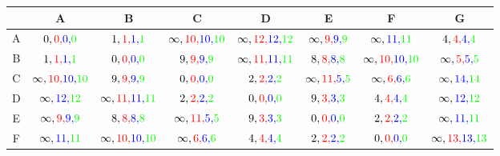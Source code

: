 \documentclass[a4paper,10pt]{article}
\begin{document}
\begin{table}[H]
\centering
\begin{tabular}{|c|c|c|c|c|c|c|c|} \hline
 & A & B & C & D & E & F & G  \\\hline
A & $ 0,{\color{red}0,}{\color{blue}0,}{\color{green}0} $ & $1,{\color{red}1,}{\color{blue}1,}{\color{green}1} $ & $ \infty,{\color{red}10,}{\color{blue}10,}{\color{green}10} $ & $ \infty,{\color{red}12,}{\color{blue}12,}{\color{green}12} $ & $ \infty,{\color{red}9,}{\color{blue}9,}{\color{green}9} $ & $ \infty,{\color{blue}11,}{\color{green}11} $ & $ 4,{\color{red}4,}{\color{blue}4,}{\color{green}4} $ \\\hline
B & $1,{\color{red}1,}{\color{blue}1,}{\color{green}1} $ & $0,{\color{red}0,}{\color{blue}0,}{\color{green}0} $ & $9,{\color{red}9,}{\color{blue}9,}{\color{green}9} $ & $\infty,{\color{red}11,}{\color{blue}11,}{\color{green}11}$ & $8,{\color{red}8,}{\color{blue}8,}{\color{green}8} $ & $\infty,{\color{red}10,}{\color{blue}10,}{\color{green}10} $ & $\infty,{\color{red}5,}{\color{blue}5,}{\color{green}5} $ \\\hline
C & $ \infty,{\color{red}10,}{\color{blue}10,}{\color{green}10}$ & $9,{\color{red}9,}{\color{blue}9,}{\color{green}9} $ & $0,{\color{red}0,}{\color{blue}0,}{\color{green}0} $ & $2,{\color{red}2,}{\color{blue}2,}{\color{green}2} $ & $ \infty,{\color{red}11,}{\color{blue}5,}{\color{green}5}$ & $\infty,{\color{red}6,}{\color{blue}6,}{\color{green}6} $ & $\infty,{\color{blue}14,}{\color{green}14} $ \\\hline
D & $\infty,{\color{blue}12,}{\color{green}12} $ & $\infty,{\color{red}11,}{\color{blue}11,}{\color{green}11} $ & $ 2,{\color{red}2,}{\color{blue}2,}{\color{green}2}$ & $0,{\color{red}0,}{\color{blue}0,}{\color{green}0} $ & $9,{\color{red}3,}{\color{blue}3,}{\color{green}3} $ & $ 4,{\color{red}4,}{\color{blue}4,}{\color{green}4}$ & $\infty,{\color{blue}12,}{\color{green}12} $ \\\hline
E & $\infty,{\color{red}9,}{\color{blue}9,}{\color{green}9} $ & $8,{\color{red}8,}{\color{blue}8,}{\color{green}8} $ & $\infty,{\color{red}11,}{\color{blue}5,}{\color{green}5} $ & $9,{\color{red}3,}{\color{blue}3,}{\color{green}3} $ & $ 0,{\color{red}0,}{\color{blue}0,}{\color{green}0}$ & $2,{\color{red}2,}{\color{blue}2,}{\color{green}2} $ & $\infty,{\color{blue}11,}{\color{green}11} $ \\\hline
F & $\infty,{\color{blue}11,}{\color{green}11} $ & $\infty,{\color{red}10,}{\color{blue}10,}{\color{green}10} $ & $\infty,{\color{red}6,}{\color{blue}6,}{\color{green}6}$ & $4,{\color{red}4,}{\color{blue}4,}{\color{green}4} $ & $2,{\color{red}2,}{\color{blue}2,}{\color{green}2} $ & $0,{\color{red}0,}{\color{blue}0,}{\color{green}0} $ & $\infty,{\color{red}13,}{\color{blue}13,}{\color{green}13} $ \\\hline

\end{tabular}
\end{table}
\end{document}
